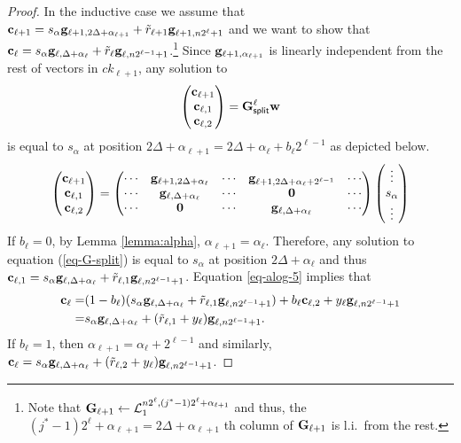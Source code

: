 \begin{proof}
In the inductive case we assume that \(\mathbf{c}_{\ell+1}=s_{\alpha}\mathbf{g}_{\ell+1,2\Delta+\alpha_{\ell+1}}+\tilde{r}_{\ell+1}\mathbf{g}_{\ell+1,n2^\ell+1}\) and we want to show that $\mathbf{c}_\ell = s_\alpha\mathbf{g}_{\ell,\Delta+\alpha_\ell}+\tilde{r}_\ell\mathbf{g}_{\ell,n2^{\ell-1}+1}$.\footnote{Note that $\mathbf{{G}}_{\ell+1}\gets\mathcal{L}_1^{n2^\ell, (j^*-1)2^\ell+\alpha_{\ell+1}}$ and thus, the $(j^*-1)2^\ell+\alpha_{\ell+1}=2\Delta+\alpha_{\ell+1}$ th column of $\mathbf{{G}}_{\ell+1}$ is l.i.~from the rest.} Since \(\mathbf{g}_{\ell+1,\alpha_{\ell+1}}\) is linearly independent from the rest of vectors in \(ck_{\ell+1}\), any solution to 
\begin{equation}
\begin{pmatrix}\mathbf{c}_{\ell+1}\\\mathbf{c}_{\ell,1}\\\mathbf{c}_{\ell,2}\end{pmatrix}=\mathbf{{G}}^{\ell}_{\mathsf{split}}\mathbf{w} \label{eq-G-split}
\end{equation}
is equal to \(s_{\alpha}\) at position \(2\Delta+\alpha_{\ell+1}=2\Delta+\alpha_\ell+b_\ell2^{\ell-1}\) as depicted below.
\begin{align*}
\left(\begin{matrix}\mathbf{c}_{\ell+1}\\\mathbf{c}_{\ell,1}\\\mathbf{c}_{\ell,2}\end{matrix}\right)=
\left(\begin{matrix}
\cdots & \mathbf{g}_{\ell+1,2\Delta+\alpha_\ell} & \cdots  & \mathbf{g}_{\ell+1,2\Delta+\alpha_\ell+2^{\ell-1}} & \cdots\\
\cdots & \mathbf{g}_{\ell,\Delta+\alpha_\ell}     & \cdots  & \mathbf{0}                           & \cdots\\
\cdots & \mathbf{0}                        & \cdots  & \mathbf{g}_{\ell,\Delta+\alpha_\ell}        & \cdots
\end{matrix}\right)
\left(\begin{matrix}\vdots\\s_\alpha\\\vdots\end{matrix}\right)
\end{align*}
If $b_{\ell}=0$, by Lemma \ref{lemma:alpha}, $\alpha_{\ell+1}=\alpha_\ell$. Therefore, any solution to equation (\ref{eq-G-split})
 is equal to $s_\alpha$ at position $2\Delta+\alpha_\ell$ and thus $\mathbf{c}_{\ell,1} = s_\alpha\mathbf{g}_{\ell,\Delta+\alpha_\ell}+\tilde{r}_{\ell,1}\mathbf{g}_{\ell,n2^{\ell-1}+1}$.
Equation \ref{eq-alog-5} implies that
\begin{align*}
\mathbf{c}_{\ell}=&(1-b_\ell)(s_\alpha\mathbf{g}_{\ell,\Delta+\alpha_\ell}+\tilde{r}_{\ell,1}\mathbf{g}_{\ell,n2^{\ell-1}+1})+b_\ell\mathbf{c}_{\ell,2}+y_\ell\mathbf{g}_{\ell,n2^{\ell-1}+1}\\
               =& s_\alpha\mathbf{g}_{\ell,\Delta+\alpha_\ell}+(\tilde{r}_{\ell,1}+y_\ell)\mathbf{g}_{\ell,n2^{\ell-1}+1}.
\end{align*}
If $b_{\ell}=1$, then $\alpha_{\ell+1}=\alpha_\ell+2^{\ell-1}$ and similarly, $\mathbf{c}_{\ell}=s_\alpha\mathbf{g}_{\ell,\Delta+\alpha_\ell}+(\tilde{r}_{\ell,2}+y_\ell)\mathbf{g}_{\ell,n2^{\ell-1}+1}$.

\end{proof}
